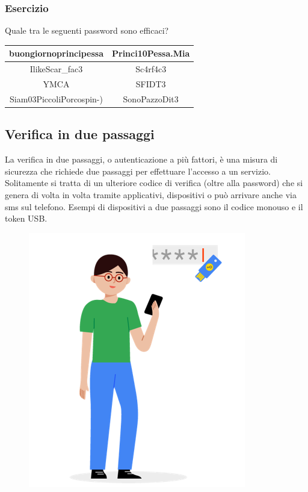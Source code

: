 \documentclass{article}
\begin{document}
\subsubsection{Esercizio}
Quale tra le seguenti password sono efficaci?\\
\vspace{5mm}
\begin{center}
	\begin{tabular}{c|c}
		buongiornoprincipessa & Princi10Pessa.Mia \\ \hline
		IlikeScar\_fac3 & Sc4rf4c3 \\ \hline
		YMCA & SFIDT3 \\ \hline
		Siam03PiccoliPorcospin-) & SonoPazzoDit3
	\end{tabular}
\end{center}
\subsection{Verifica in due passaggi}
La verifica in due passaggi, o autenticazione a più fattori, è una misura di sicurezza che richiede due passaggi per effettuare l'accesso a un servizio. 
Solitamente si tratta di un ulteriore codice di verifica (oltre alla password) che si genera di volta in volta tramite applicativi, dispositivi o può arrivare anche via sms sul telefono. Esempi di dispositivi a due passaggi sono il codice monouso e il token USB.
\begin{figure}[h!]
	\centering
	\includegraphics[scale=0.5]{Passaggi1.png}
\end{figure}
\end{document}
